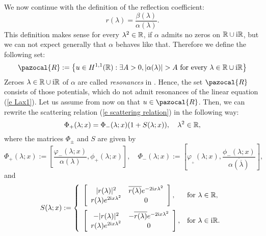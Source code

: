 We now continue with the definition of the reflection coefficient:
\begin{equation}\label{e def r}
    r(\lambda)=\frac{\beta(\lambda)}{\alpha(\lambda)}.
\end{equation}
This definition makes sense for every $\lambda^2\in\mathbb R$, if $\alpha$ admits no zeros on $\mathbb R\cup\mathrm{i}\mathbb R$, but we can not expect generally that $\alpha$ behaves like that. Therefore we define the following set:
\begin{equation}\label{e def no resonances}
    \pazocal{R}:=\set{u\in H^{1,1}(\Real):\exists A>0,|\alpha(\lambda)|>A\text{ for every }\lambda\in\Real\cup\ii\Real}
\end{equation}
Zeroes $\lambda\in\mathbb R\cup\mathrm{i}\mathbb R$ of $\alpha$ are called \emph{resonances} in \cite{Pelinovsky2016}. Hence, the set $\pazocal{R}$ consists of those potentials, which do not admit resonances of the linear equation (\ref{e Lax1}). Let us assume from now on that $u\in \pazocal{R}$. Then,  we can rewrite the scattering relation (\ref{e scattering relation}) in the following way:
\begin{equation}\label{e alternative scattering relation}
    \Phi_+(\lambda;x)=\Phi_-(\lambda;x)(1+S(\lambda;x)), \quad\lambda^2\in\mathbb R,
\end{equation}
where the matrices $\Phi_{\pm}$ and $S$ are given by
\begin{equation}\label{e def Phi}
    \Phi_+(\lambda;x):=
    \left[\frac{\varphi_{-}(\lambda;x)} {\alpha(\lambda)},\phi_{+}(\lambda;x)
    \right],\quad
    \Phi_-(\lambda;x):=
    \left[\varphi_{_+}(\lambda;x) ,\frac{\phi_{-}(\lambda;x)} {\overline{\alpha(\overline{\lambda})}}
    \right],
\end{equation}
and
\begin{equation}\label{e def S}
    S(\lambda;x):=
    \left\{
      \begin{array}{ll}
        \left[
          \begin{array}{cc}
            |r(\lambda)|^2 & \overline{r(\lambda)} e^{-2\ii x\lambda^2} \\
            r(\lambda) e^{2\ii x\lambda^2} & 0 \\
          \end{array}
        \right]
        , & \hbox{for }\lambda\in\Real,\vspace{2mm} \\ \left[
          \begin{array}{cc}
            -|r(\lambda)|^2 & -\overline{r(\lambda)} e^{-2\ii x\lambda^2} \\
            r(\lambda) e^{2\ii x\lambda^2} & 0 \\
          \end{array}
        \right]
        , & \hbox{for }\lambda\in\ii\Real.
      \end{array}
    \right.
\end{equation}
